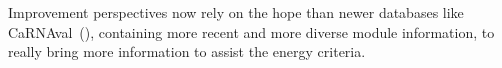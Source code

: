 \documentclass{bioinfo}
\begin{document}
Improvement perspectives now rely on the hope than newer databases like CaRNAval~(\citealp{reinharz2018mining}), containing more recent and more diverse module information, to really bring more information to assist the energy criteria.\\


%
%
%
%
%


\end{document}
